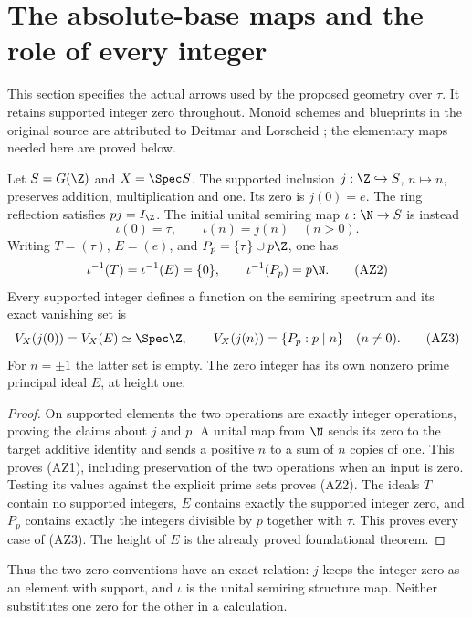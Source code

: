 \section{The absolute-base maps and the role of every integer}
\label{sec:absolute-base-maps}
This section specifies the actual arrows used by the proposed geometry over
$\tau$. It retains supported integer zero throughout. Monoid schemes and
blueprints in the original source are attributed to Deitmar and Lorscheid
\cite{deitmar,lorscheid}; the elementary maps needed here are proved below.

\begin{proposition}
Let $S=G(\Z)$ and $X=\Spec S$. The supported inclusion
$j:\Z\hookrightarrow S$, $n\mapsto n$, preserves addition, multiplication
and one. Its zero is $j(0)=e$. The ring reflection satisfies $pj=I_\Z$.
The initial unital semiring map $\iota:\N\to S$ is instead
\[
 \iota(0)=\tau,\qquad \iota(n)=j(n)\quad(n>0).
 \tag{AZ1}
\]
Writing $T=(\tau)$, $E=(e)$, and $P_p=\{\tau\}\cup p\Z$, one has
\[
 \iota^{-1}(T)=\iota^{-1}(E)=\{0\},\qquad
 \iota^{-1}(P_p)=p\N.
 \tag{AZ2}
\]
Every supported integer defines a function on the semiring spectrum and
its exact vanishing set is
\[
 V_X(j(0))=V_X(E)\simeq\Spec\Z,\qquad
 V_X(j(n))=\{P_p:p\mid n\}\quad(n\ne0).
 \tag{AZ3}
\]
For $n=\pm1$ the latter set is empty. The zero integer has its own
nonzero prime principal ideal $E$, at height one.
\end{proposition}
\begin{proof}
On supported elements the two operations are exactly integer operations,
proving the claims about $j$ and $p$. A unital map from $\N$ sends its zero
to the target additive identity and sends a positive $n$ to a sum of $n$
copies of one. This proves (AZ1), including preservation of the two
operations when an input is zero. Testing its values against the explicit
prime sets proves (AZ2). The ideals $T$ contain no supported integers,
$E$ contains exactly the supported integer zero, and $P_p$ contains exactly
the integers divisible by $p$ together with $\tau$. This proves every case
of (AZ3). The height of $E$ is the already proved foundational theorem.
\end{proof}

Thus the two zero conventions have an exact relation: $j$ keeps the
integer zero as an element with support, and $\iota$ is the unital semiring
structure map. Neither substitutes one zero for the other in a calculation.

